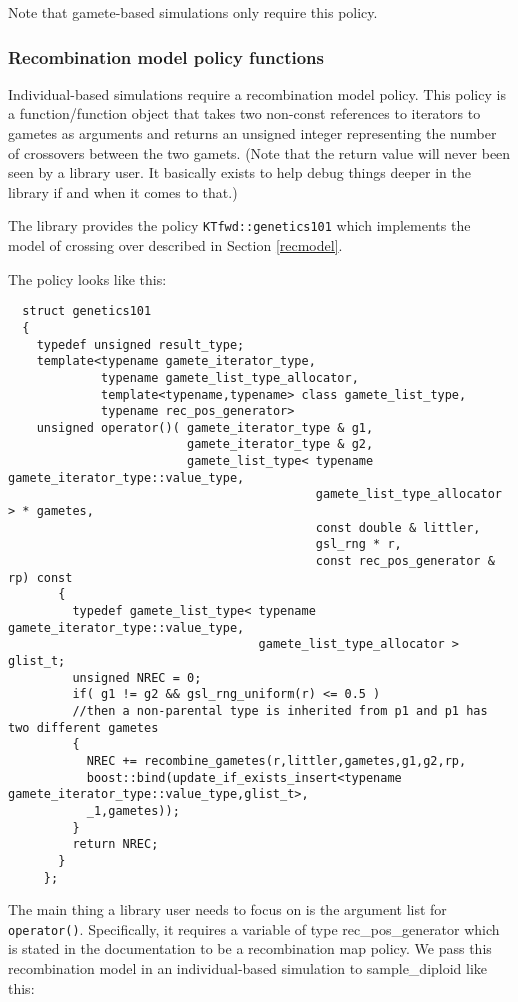 \documentclass{article}
\begin{document}
Note that gamete-based simulations only require this policy.

\subsubsection{Recombination model policy functions}
Individual-based simulations require a recombination model policy.  This policy is a function/function object that takes two non-const references to iterators to gametes as arguments and returns an unsigned integer representing the number of crossovers between the two gamets.  (Note that the return value will never been seen by a library user.  It basically exists to help debug things deeper in the library if and when it comes to that.)  

The library provides the policy \texttt{KTfwd::genetics101} which implements the model of crossing over described in Section \ref{recmodel}.  

The policy looks like this:
\begin{lstlisting}
  struct genetics101
  {
    typedef unsigned result_type;
    template<typename gamete_iterator_type,
             typename gamete_list_type_allocator,
             template<typename,typename> class gamete_list_type,
             typename rec_pos_generator>
    unsigned operator()( gamete_iterator_type & g1,
                         gamete_iterator_type & g2,
                         gamete_list_type< typename gamete_iterator_type::value_type,
                                           gamete_list_type_allocator > * gametes,
                                           const double & littler,
                                           gsl_rng * r,
                                           const rec_pos_generator & rp) const
       {
         typedef gamete_list_type< typename gamete_iterator_type::value_type, 
                                   gamete_list_type_allocator > glist_t;
         unsigned NREC = 0;
         if( g1 != g2 && gsl_rng_uniform(r) <= 0.5 )
         //then a non-parental type is inherited from p1 and p1 has two different gametes                                    
         {
           NREC += recombine_gametes(r,littler,gametes,g1,g2,rp,
           boost::bind(update_if_exists_insert<typename gamete_iterator_type::value_type,glist_t>,
           _1,gametes));
         }
         return NREC;
       }
     };
\end{lstlisting}

The main thing a library user needs to focus on is the argument list for \texttt{operator()}.  Specifically, it requires a variable of type rec\_pos\_generator which is stated in the documentation to be a recombination map policy. We pass this recombination model in an individual-based simulation to sample\_diploid like this:
\end{document}

